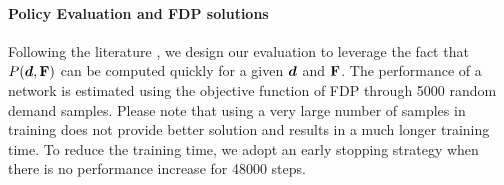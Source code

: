 \documentclass{article} %
\begin{document}

\vspace{-1mm}
\paragraph{Policy Evaluation and FDP solutions} 
Following the literature \citep{JG95}, we design our evaluation to leverage the fact that $P(\boldsymbol{d}, \mathbf{F})$ can be computed quickly for a given $\boldsymbol{d}$ and $\mathbf{F}$. The performance of a network is estimated using the objective function of FDP through 5000 random demand samples. Please note that using a very large number of samples in training does not provide better solution and results in a much longer training time. To reduce the training time, we adopt an early stopping strategy when there is no performance increase for 48000 steps. 



\end{document}
